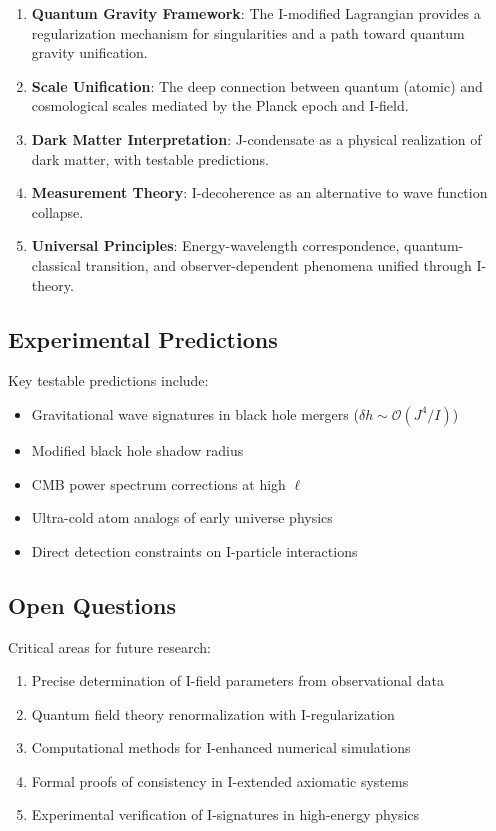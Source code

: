 \documentclass[12pt,a4paper]{article}
\theoremstyle{definition}
\theoremstyle{remark}
\begin{document}
\begin{enumerate}
    \item \textbf{Quantum Gravity Framework}: The I-modified Lagrangian provides a regularization mechanism for singularities and a path toward quantum gravity unification.
    
    \item \textbf{Scale Unification}: The deep connection between quantum (atomic) and cosmological scales mediated by the Planck epoch and I-field.
    
    \item \textbf{Dark Matter Interpretation}: J-condensate as a physical realization of dark matter, with testable predictions.
    
    \item \textbf{Measurement Theory}: I-decoherence as an alternative to wave function collapse.
    
    \item \textbf{Universal Principles}: Energy-wavelength correspondence, quantum-classical transition, and observer-dependent phenomena unified through I-theory.
\end{enumerate}

\subsection{Experimental Predictions}

Key testable predictions include:

\begin{itemize}
    \item Gravitational wave signatures in black hole mergers ($\delta h \sim \mathcal{O}(J^4/I)$)
    \item Modified black hole shadow radius
    \item CMB power spectrum corrections at high $\ell$
    \item Ultra-cold atom analogs of early universe physics
    \item Direct detection constraints on I-particle interactions
\end{itemize}

\subsection{Open Questions}

Critical areas for future research:

\begin{enumerate}
    \item Precise determination of I-field parameters from observational data
    \item Quantum field theory renormalization with I-regularization
    \item Computational methods for I-enhanced numerical simulations
    \item Formal proofs of consistency in I-extended axiomatic systems
    \item Experimental verification of I-signatures in high-energy physics
\end{enumerate}
\end{document}
